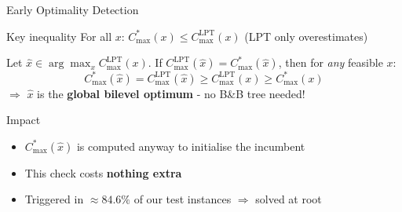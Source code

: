 \documentclass[fleqn,11pt,aspectratio=43]{beamer}
\newcommand{\Copt}{C_{\max}^{*}}
\newcommand{\Clpt}{C_{\max}^{\mathrm{LPT}}}
\begin{document}
\begin{frame}[shrink=5]{Early Optimality Detection}
  \begin{block}{Key inequality}
    For all $x$: $\Copt(x)\leq\Clpt(x)$ (LPT only overestimates)
  \end{block}
  Let $\hat x\in\arg\max_x\Clpt(x)$. If $\Clpt(\hat x)=\Copt(\hat x)$, then for \emph{any} feasible $x$:
  \[\Copt(\hat x)=\Clpt(\hat x)\geq\Clpt(x)\geq\Copt(x)\]
  $\Rightarrow$ $\hat x$ is the \textbf{global bilevel optimum} - no B\&B tree needed!
  \begin{alertblock}{Impact}
    \begin{itemize}
      \item $\Copt(\hat x)$ is computed anyway to initialise the incumbent
      \item This check costs \textbf{nothing extra}
      \item Triggered in $\approx\mathbf{84.6\%}$ of our test instances $\Rightarrow$ solved at root
    \end{itemize}
  \end{alertblock}
\end{frame}
\end{document}
